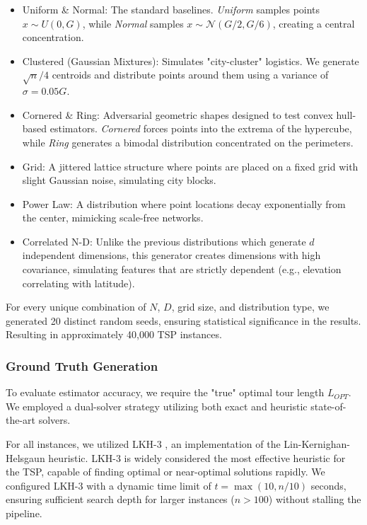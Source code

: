\documentclass{article}
\begin{document}
\begin{itemize}
    \item Uniform \& Normal: The standard baselines. \textit{Uniform} samples points $x \sim U(0, G)$, while \textit{Normal} samples $x \sim \mathcal{N}(G/2, G/6)$, creating a central concentration.
    \item Clustered (Gaussian Mixtures): Simulates "city-cluster" logistics. We generate $\sqrt{n}/4$ centroids and distribute points around them using a variance of $\sigma = 0.05G$.
    \item Cornered \& Ring: Adversarial geometric shapes designed to test convex hull-based estimators. \textit{Cornered} forces points into the extrema of the hypercube, while \textit{Ring} generates a bimodal distribution concentrated on the perimeters.
    \item Grid: A jittered lattice structure where points are placed on a fixed grid with slight Gaussian noise, simulating city blocks.
    \item Power Law: A  distribution where point locations decay exponentially from the center, mimicking scale-free networks.
    \item Correlated N-D: Unlike the previous distributions which generate $d$ independent dimensions, this generator creates dimensions with high covariance, simulating features that are strictly dependent (e.g., elevation correlating with latitude).
\end{itemize}

For every unique combination of $N$, $D$, grid size, and distribution type, we generated 20 distinct random seeds, ensuring statistical significance in the results. Resulting in approximately 40,000 TSP instances.

\subsubsection{Ground Truth Generation}
To evaluate estimator accuracy, we require the "true" optimal tour length $L_{OPT}$. We employed a dual-solver strategy utilizing both exact and heuristic state-of-the-art solvers.

For all instances, we utilized LKH-3 \cite{helsgaun2017}, an implementation of the Lin-Kernighan-Helsgaun heuristic. LKH-3 is widely considered the most effective heuristic for the TSP, capable of finding optimal or near-optimal solutions rapidly. We configured LKH-3 with a dynamic time limit of $t = \max(10, n/10)$ seconds, ensuring sufficient search depth for larger instances ($n > 100$) without stalling the pipeline.
\end{document}
